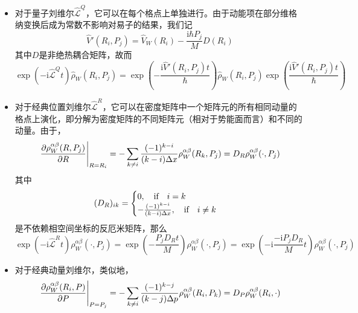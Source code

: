 \documentclass[UTF8,12pt]{article}
\begin{document}
        \begin{itemize}
            \item 对于量子刘维尔$\hat{\mathcal{L}}^Q$，它可以在每个格点上单独进行。由于动能项在部分维格纳变换后成为常数不影响对易子的结果，我们记
            \begin{equation}
                \hat{V}'(R_i,P_j)=\hat{V}_W(R_i)-\frac{\mathrm{i}\hbar P_j}{M}D(R_i)
            \end{equation}
            其中$D$是非绝热耦合矩阵，故而
            \begin{equation}
                \exp(-\mathrm{i}\hat{\mathcal{L}}^Qt)\hat{\rho}_W(R_i,P_j)=\exp(-\frac{\mathrm{i}\hat{V}'(R_i,P_j)t}{\hbar})\hat{\rho}_W(R_i,P_j)\exp(\frac{\mathrm{i}\hat{V}'(R_i,P_j)t}{\hbar})
            \end{equation}
            \item 对于经典位置刘维尔$\hat{\mathcal{L}}^R$，它可以在密度矩阵中一个矩阵元的所有相同动量的格点上演化，即分解为密度矩阵的不同矩阵元（相对于势能面而言）和不同的动量。由于，
            \begin{equation}
                \eval{\pdv{\rho^{\alpha\beta}_W(R,P_j)}{R}}_{R=R_i}=-\sum_{k\neq i}{\frac{(-1)^{k-i}}{(k-i)\Delta x}\rho^{\alpha\beta}_W(R_k,P_j)}=D_R\rho_W^{\alpha\beta}(\cdot,P_j)
            \end{equation}
            其中
            \begin{equation}
                (D_R)_{ik}=\begin{cases}
                    0,\qif i=k\\
                    -\frac{(-1)^{k-i}}{(k-i)\Delta x},\qif i\neq k
                \end{cases}
            \end{equation}
            是不依赖相空间坐标的反厄米矩阵，那么
            \begin{equation}
                \exp(-\mathrm{i}\hat{\mathcal{L}}^Rt)\rho_W^{\alpha\beta}(\cdot,P_j)=\exp(-\frac{P_jD_Rt}{M})\rho_W^{\alpha\beta}(\cdot,P_j)=\exp(-\mathrm{i}\frac{-\mathrm{i}P_jD_R}{M}t)\rho_W^{\alpha\beta}(\cdot,P_j)
            \end{equation}
            \item 对于经典动量刘维尔，类似地，
            \begin{equation}
                \eval{\pdv{\rho^{\alpha\beta}_W(R_i,P)}{P}}_{P=P_j}=-\sum_{k\neq i}{\frac{(-1)^{k-j}}{(k-j)\Delta p}\rho^{\alpha\beta}_W(R_i,P_k)}=D_P\rho_W^{\alpha\beta}(R_i,\cdot)
            \end{equation}

\end{itemize}
\end{document}
